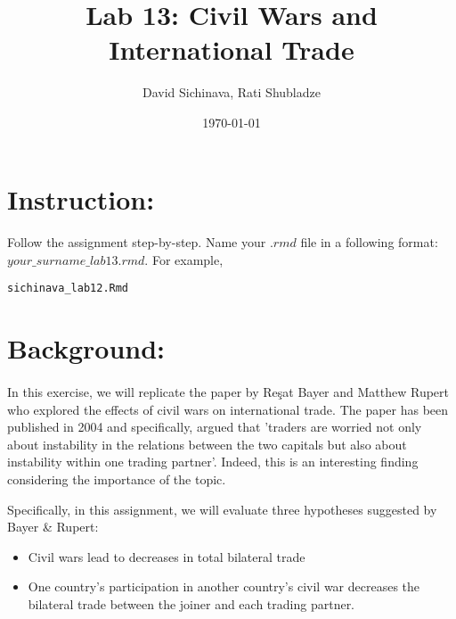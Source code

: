 \documentclass{article}\usepackage[]{graphicx}\usepackage[]{color}
\title{Lab 13: Civil Wars and International Trade}
\author{David Sichinava, Rati Shubladze}
\date{\today}
\makeatletter
\newcommand{\hlstd}[1]{\textcolor[rgb]{0.345,0.345,0.345}{#1}}%
\newenvironment{kframe}{%
 \def\at@end@of@kframe{}%
 \ifinner\ifhmode%
  \def\at@end@of@kframe{\end{minipage}}%
  \begin{minipage}{\columnwidth}%
 \fi\fi%
 \def\FrameCommand##1{\hskip\@totalleftmargin \hskip-\fboxsep
 \colorbox{shadecolor}{##1}\hskip-\fboxsep
     \hskip-\linewidth \hskip-\@totalleftmargin \hskip\columnwidth}%
 \MakeFramed {\advance\hsize-\width
   \@totalleftmargin\z@ \linewidth\hsize
   \@setminipage}}%
 {\par\unskip\endMakeFramed%
 \at@end@of@kframe}
\newenvironment{knitrout}{}{} %
\makeatother
\begin{document}
\maketitle

\section*{Instruction:}

\paragraph{}
Follow the assignment step-by-step. Name your $.rmd$ file in a following format: $your\_surname\_lab13.rmd$. For example,

\begin{knitrout}
\color{fgcolor}\begin{kframe}
\begin{alltt}
\hlstd{sichinava_lab12.Rmd}
\end{alltt}
\end{kframe}
\end{knitrout}

\section*{Background:}
\paragraph{}

In this exercise, we will replicate the paper by Re\c{s}at Bayer and Matthew Rupert who explored the effects of civil wars on international trade. The paper has been published in 2004 and specifically, argued that 'traders are worried not only about instability in the relations between the two capitals but also about instability within one trading partner'. Indeed, this is an interesting finding considering the importance of the topic.

Specifically, in this assignment, we will evaluate three hypotheses suggested by Bayer \& Rupert:

\begin{itemize}
\item{Civil wars lead to decreases in total bilateral trade}
\item{One country’s participation in another country’s civil war decreases the bilateral trade between the joiner and each trading partner.}
\end{itemize}
\end{document}
